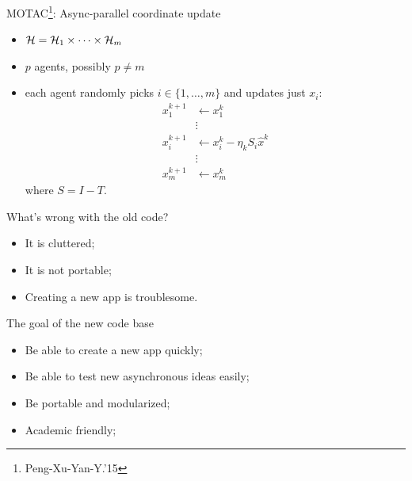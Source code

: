 \documentclass[hyperref,handout,compress,9pt,mathserif]{beamer}
\begin{document}
\begin{frame}{MOTAC\footnote{Peng-Xu-Yan-Y.'15}: Async-parallel coordinate update}

\begin{itemize}
  \item ${\mathcal{H}} = {\mathcal{H}}_1 \times \cdots \times {\mathcal{H}}_m$
  \item $p$ agents, possibly $p\not=m$
  \item each agent {randomly picks} $i\in\{1,\ldots,m\}$ and updates just $x_i$:
\begin{align*}
x_1^{k+1}&\gets x_1^k\\
&\vdots\\
x_i^{k+1}&\gets x_i^k - \eta_k S_i {\hat{x}^k}\\
&\vdots\\
x_{m}^{k+1}&\gets x_{m}^k
\end{align*}
where $S = I - T$.
\end{itemize}
\end{frame}

\begin{frame}{What's wrong with the old code?}
\begin{itemize}
\item It is cluttered;
\item It is not portable;
\item Creating a new app is troublesome.
\end{itemize}
\end{frame}

\begin{frame}{The goal of the new code base}
\begin{itemize}
\item Be able to create a new app quickly;
\item Be able to test new asynchronous ideas easily;
\item Be portable and modularized;
\item Academic friendly;
\end{itemize}
\end{frame}
\end{document}
